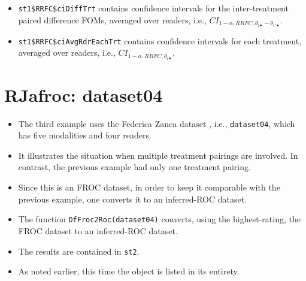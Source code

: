 \documentclass[
]{book}
\newenvironment{Shaded}{\begin{snugshade}}{\end{snugshade}}
\newcommand{\CommentTok}[1]{\textcolor[rgb]{0.56,0.35,0.01}{\textit{#1}}}
\newcommand{\DataTypeTok}[1]{\textcolor[rgb]{0.13,0.29,0.53}{#1}}
\newcommand{\DecValTok}[1]{\textcolor[rgb]{0.00,0.00,0.81}{#1}}
\newcommand{\KeywordTok}[1]{\textcolor[rgb]{0.13,0.29,0.53}{\textbf{#1}}}
\newcommand{\NormalTok}[1]{#1}
\newcommand{\OperatorTok}[1]{\textcolor[rgb]{0.81,0.36,0.00}{\textbf{#1}}}
\providecommand{\tightlist}{%
  \setlength{\itemsep}{0pt}\setlength{\parskip}{0pt}}
\begin{document}
\begin{itemize}
\tightlist
\item
  \texttt{st1\$RRFC\$ciDiffTrt} contains confidence intervals for the inter-treatment paired difference FOMs, averaged over readers, i.e., \(CI_{1-\alpha,RRFC,\theta_{i \bullet} - \theta_{i' \bullet}}\).
\end{itemize}

\begin{Shaded}
\end{Shaded}

\begin{itemize}
\tightlist
\item
  \texttt{st1\$RRFC\$ciAvgRdrEachTrt} contains confidence intervals for each treatment, averaged over readers, i.e., \(CI_{1-\alpha,RRFC,\theta_{i \bullet}}\).
\end{itemize}

\hypertarget{or-applications-dataset04-RJafroc}{%
\section{RJafroc: dataset04}\label{or-applications-dataset04-RJafroc}}

\begin{itemize}
\tightlist
\item
  The third example uses the Federica Zanca dataset \citep{RN1882}, i.e., \texttt{dataset04}, which has five modalities and four readers.
\item
  It illustrates the situation when multiple treatment pairings are involved. In contrast, the previous example had only one treatment pairing.
\item
  Since this is an FROC dataset, in order to keep it comparable with the previous example, one converts it to an inferred-ROC dataset.
\item
  The function \texttt{DfFroc2Roc(dataset04)} converts, using the highest-rating, the FROC dataset to an inferred-ROC dataset.
\item
  The results are contained in \texttt{st2}.
\item
  As noted earlier, this time the object is listed in its entirety.
\end{itemize}
\end{document}
